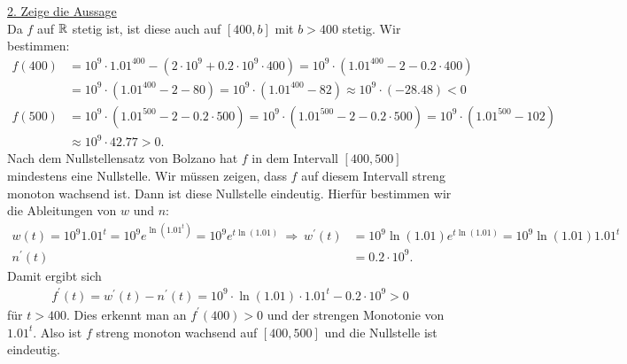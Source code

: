 \underline{2. Zeige die Aussage}\\
Da $ f $ auf $ \mathbb{R} $ stetig ist, ist diese auch auf $ [400, b] $ mit $ b > 400 $ stetig.
Wir bestimmen:
\begin{align*}
	f(400) &= 10^9 \cdot 1.01^{ 400} - (2 \cdot 10^9 + 0.2 \cdot 10^9 \cdot 400 )
	= 10^9 \cdot (1.01^{ 400} - 2 - 0.2 \cdot 400)\\
	&= 10^9 \cdot (1.01^{ 400} - 2 - 80) 
	=  10^9 \cdot (1.01^{ 400} -82) 
	\approx 10^9 \cdot (- 28.48) < 0\\
	f(500) &= 10^9 \cdot (1.01^{ 500} - 2 - 0.2 \cdot 500)
	 = 10^9 \cdot (1.01^{ 500} - 2 - 0.2 \cdot 500)
	= 10^9 \cdot (1.01^{ 500} - 102)\\
	&\approx 10^9 \cdot 42.77 > 0.
\end{align*}
Nach dem Nullstellensatz von Bolzano hat $ f $ in dem Intervall $ [400,500] $  mindestens eine Nullstelle. Wir müssen zeigen, dass $ f  $ auf diesem Intervall streng monoton wachsend ist. Dann ist diese Nullstelle eindeutig.
Hierfür bestimmen wir die Ableitungen von $ w $ und $ n $:
\begin{align*}
	w(t) = 10^9 1.01^t = 10^9 e^{\ln(1.01^t)}
	=
	10^9 e^{t \ln(1.01)} \ \Rightarrow \
	w^\prime(t) &= 10^9 \ln(1.01) e^{t \ln(1.01)} = 10^9 \ln(1.01) 1.01^t\\
	n^\prime(t) &= 0.2\cdot 10^9.
\end{align*}
Damit ergibt sich
\begin{align*}
	f^\prime(t) = w^\prime(t) - n^\prime(t)
	= 
	10^9 \cdot  \ln(1.01) \cdot 1.01^t - 0.2\cdot 10^9 > 0
\end{align*}
für $ t > 400 $. 
Dies erkennt man an $ f^\prime(400) >0  $ und der strengen Monotonie von $ 1.01^t $.
Also ist $ f $ streng monoton wachsend auf $ [400,500] $ und die Nullstelle ist eindeutig.
 
\newpage

